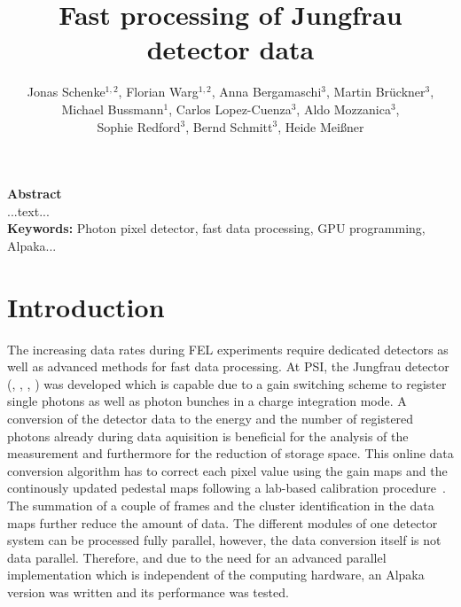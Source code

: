 \documentclass[a4paper]{article}
\begin{document}
\title{Fast processing of Jungfrau detector data}
\author{Jonas Schenke$^{1,2}$, 
Florian Warg$^{1,2}$, 
Anna Bergamaschi$^3$,
Martin Br\"uckner$^3$,\\
Michael Bussmann$^1$,
Carlos Lopez-Cuenza$^3$,
Aldo Mozzanica$^3$,\\
Sophie Redford$^3$,
Bernd Schmitt$^3$,
Heide Mei{\ss}ner}




\date{}

\renewcommand\Affilfont{\itshape}



\maketitle
{\bf Abstract}\\
...text...\\

{\bf Keywords:} Photon pixel detector, fast data processing, GPU programming, Alpaka...



\section{Introduction}

The increasing data rates during FEL experiments require dedicated detectors as well as advanced methods for fast data processing.
At PSI, the Jungfrau detector (\cite{jungfrau1}, \cite{jungfrau2}, \cite{jungfrau3}, \cite{Mozzanica_2016}) was developed which is capable due to a gain switching scheme to register single photons as well as photon bunches in a charge integration mode. A conversion of the detector data to the energy and the number of registered photons already during data aquisition is beneficial for the analysis of the measurement and furthermore for the reduction of storage space. This online data conversion algorithm has to correct each pixel value using the gain maps and the continously updated pedestal maps following a lab-based calibration  procedure~\cite{jungfrau2}. The summation of a couple of frames and the cluster identification in the data maps further reduce the amount of data. The different modules of one detector system can be processed fully parallel, however, the data conversion itself is not data parallel. Therefore, and due to the need for an advanced parallel implementation which is independent of the computing hardware, an Alpaka~\cite{Matthes17} version was written and its performance was tested.\\
\end{document}
